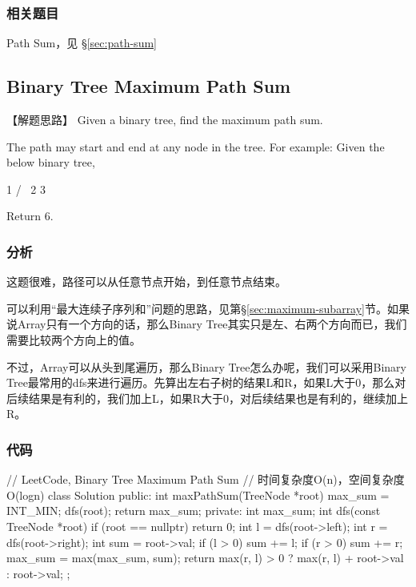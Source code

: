 \subsubsection{相关题目}
\begindot
\item Path Sum，见 \S \ref{sec:path-sum}
\myenddot


\subsection{Binary Tree Maximum Path Sum}
\label{sec:binary-tree-maximum-path-sum}


【解题思路】
Given a binary tree, find the maximum path sum.

The path may start and end at any node in the tree.
For example:
Given the below binary tree,
\begin{Code}
	1
	/ \
	2   3
\end{Code}
Return $6$.


\subsubsection{分析}
这题很难，路径可以从任意节点开始，到任意节点结束。

可以利用“最大连续子序列和”问题的思路，见第\S \ref{sec:maximum-subarray}节。如果说Array只有一个方向的话，那么Binary Tree其实只是左、右两个方向而已，我们需要比较两个方向上的值。

不过，Array可以从头到尾遍历，那么Binary Tree怎么办呢，我们可以采用Binary Tree最常用的dfs来进行遍历。先算出左右子树的结果L和R，如果L大于0，那么对后续结果是有利的，我们加上L，如果R大于0，对后续结果也是有利的，继续加上R。

\subsubsection{代码}

\begin{Code}
	// LeetCode, Binary Tree Maximum Path Sum
	// 时间复杂度O(n)，空间复杂度O(logn)
	class Solution {
		public:
		int maxPathSum(TreeNode *root) {
			max_sum = INT_MIN;
			dfs(root);
			return max_sum;
		}
		private:
		int max_sum;
		int dfs(const TreeNode *root) {
			if (root == nullptr) return 0;
			int l = dfs(root->left);
			int r = dfs(root->right);
			int sum = root->val;
			if (l > 0) sum += l;
			if (r > 0) sum += r;
			max_sum = max(max_sum, sum);
			return max(r, l) > 0 ? max(r, l) + root->val : root->val;
		}
	};
\end{Code}

